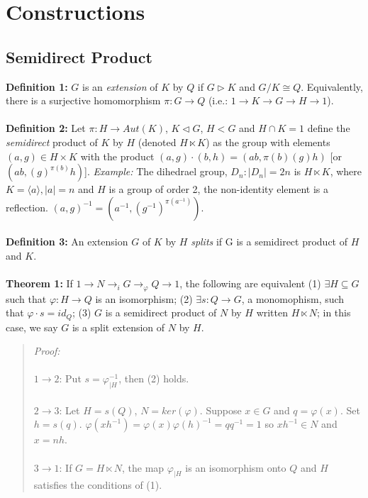 \chapter{Constructions}
\section {Semidirect Product}
{\bf Definition 1:}
$G$ is an \emph{extension} of $K$ by $Q$ if $G \triangleright K$ and $G/K \cong Q$.  Equivalently,
there is a surjective homomorphism $\pi:G \rightarrow Q$ (i.e.: $1 \rightarrow K \rightarrow G \rightarrow H \rightarrow 1$).
\\
\\
{\bf Definition 2:}
Let $\pi: H \rightarrow Aut(K)$, $K \lhd G$, $H<G$ and $H \cap K = 1$ define the
\emph {semidirect} product of $K$ by $H$ (denoted $H \ltimes K$) as the group with elements
$(a, g) \in H \times K$ with the product $(a, g) \cdot (b, h)= (ab, \pi(b)(g)h)$ [or $(ab, (g)^{\pi(b)}h)$].
\emph{Example:} The dihedrael group, $D_n : |D_n|=2n$ is $H \ltimes K$, where $K= \langle a \rangle, |a|=n$ and
$H$ is a group of order 2, the non-identity element is a reflection.  $(a, g)^{-1} = (a^{-1}, (g^{-1})^{\pi(a^{-1})})$.
\\
\\
{\bf Definition 3:} An extension $G$ of $K$ by $H$ \emph {splits} if G is a semidirect product of $H$ and $K$.
\\
\\
{\bf Theorem 1:}
If $1 \rightarrow N \rightarrow_{i} G \rightarrow_{\varphi} Q \rightarrow 1$, the following
are equivalent
(1) $\exists H \subseteq G$ such that $\varphi: H \rightarrow Q$ is an isomorphism;
(2) $\exists s:Q \rightarrow G$, a monomophism, such that $\varphi \cdot s = id_Q$;
(3) $G$ is a semidirect product of $N$ by $H$ written $H \ltimes N$; in this
case, we say $G$ is a split extension of $N$ by $H$.
\begin{quote}
\emph{Proof:}
\\
\\
$1 \rightarrow 2$:
Put $s= \varphi_{|H}^{-1}$, then (2) holds.
\\
\\
$2 \rightarrow 3$:
Let $H= s(Q)$, $N= ker(\varphi)$.  Suppose $x \in G$ and $q= \varphi(x)$.  Set
$h= s(q)$.  $\varphi(x h^{-1})= \varphi(x) \varphi(h)^{-1} = q q^{-1}= 1$ so
$x h^{-1} \in N$ and $x= nh$.
\\
\\
$3 \rightarrow 1$:
If $G= H \ltimes N$, the map $\varphi_{|H}$ is an isomorphism onto $Q$ and $H$ satisfies the
conditions of (1).
\end{quote}
